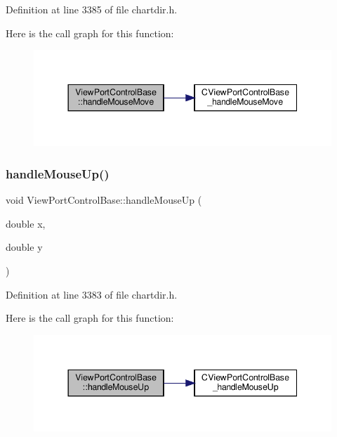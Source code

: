 Definition at line 3385 of file chartdir.\+h.

Here is the call graph for this function\+:
\nopagebreak
\begin{figure}[H]
\begin{center}
\leavevmode
\includegraphics[width=344pt]{class_view_port_control_base_ab7bf3d47eb60524b9ba3a4506ebc9345_cgraph}
\end{center}
\end{figure}
\mbox{\label{class_view_port_control_base_ac66da55984813513cf33f3b1b608bd9a}} 
\subsubsection{\texorpdfstring{handle\+Mouse\+Up()}{handleMouseUp()}}
{\footnotesize\ttfamily void View\+Port\+Control\+Base\+::handle\+Mouse\+Up (\begin{DoxyParamCaption}\item[{double}]{x,  }\item[{double}]{y }\end{DoxyParamCaption})\hspace{0.3cm}{\ttfamily [inline]}}



Definition at line 3383 of file chartdir.\+h.

Here is the call graph for this function\+:
\nopagebreak
\begin{figure}[H]
\begin{center}
\leavevmode
\includegraphics[width=344pt]{class_view_port_control_base_ac66da55984813513cf33f3b1b608bd9a_cgraph}
\end{center}
\end{figure}
\mbox{\label{class_view_port_control_base_affc7aa4c21872bb06c51665c3a65e565}} 

